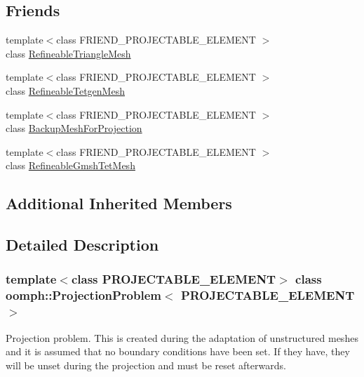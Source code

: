 \subsection*{Friends}
\begin{DoxyCompactItemize}
\item 
{\footnotesize template$<$class F\+R\+I\+E\+N\+D\+\_\+\+P\+R\+O\+J\+E\+C\+T\+A\+B\+L\+E\+\_\+\+E\+L\+E\+M\+E\+NT $>$ }\\class \hyperlink{classoomph_1_1ProjectionProblem_a13d7a9943fbdd399011c849d5839c211}{Refineable\+Triangle\+Mesh}
\item 
{\footnotesize template$<$class F\+R\+I\+E\+N\+D\+\_\+\+P\+R\+O\+J\+E\+C\+T\+A\+B\+L\+E\+\_\+\+E\+L\+E\+M\+E\+NT $>$ }\\class \hyperlink{classoomph_1_1ProjectionProblem_a999f3861375bbdf2365f6ab38447a2c4}{Refineable\+Tetgen\+Mesh}
\item 
{\footnotesize template$<$class F\+R\+I\+E\+N\+D\+\_\+\+P\+R\+O\+J\+E\+C\+T\+A\+B\+L\+E\+\_\+\+E\+L\+E\+M\+E\+NT $>$ }\\class \hyperlink{classoomph_1_1ProjectionProblem_a01ad4b9aac17e6b8e251ce52ba21bfe4}{Backup\+Mesh\+For\+Projection}
\item 
{\footnotesize template$<$class F\+R\+I\+E\+N\+D\+\_\+\+P\+R\+O\+J\+E\+C\+T\+A\+B\+L\+E\+\_\+\+E\+L\+E\+M\+E\+NT $>$ }\\class \hyperlink{classoomph_1_1ProjectionProblem_a933521be2c09eb1842625109de7a8b66}{Refineable\+Gmsh\+Tet\+Mesh}
\end{DoxyCompactItemize}
\subsection*{Additional Inherited Members}


\subsection{Detailed Description}
\subsubsection*{template$<$class P\+R\+O\+J\+E\+C\+T\+A\+B\+L\+E\+\_\+\+E\+L\+E\+M\+E\+NT$>$\newline
class oomph\+::\+Projection\+Problem$<$ P\+R\+O\+J\+E\+C\+T\+A\+B\+L\+E\+\_\+\+E\+L\+E\+M\+E\+N\+T $>$}

Projection problem. This is created during the adaptation of unstructured meshes and it is assumed that no boundary conditions have been set. If they have, they will be unset during the projection and must be reset afterwards. 

